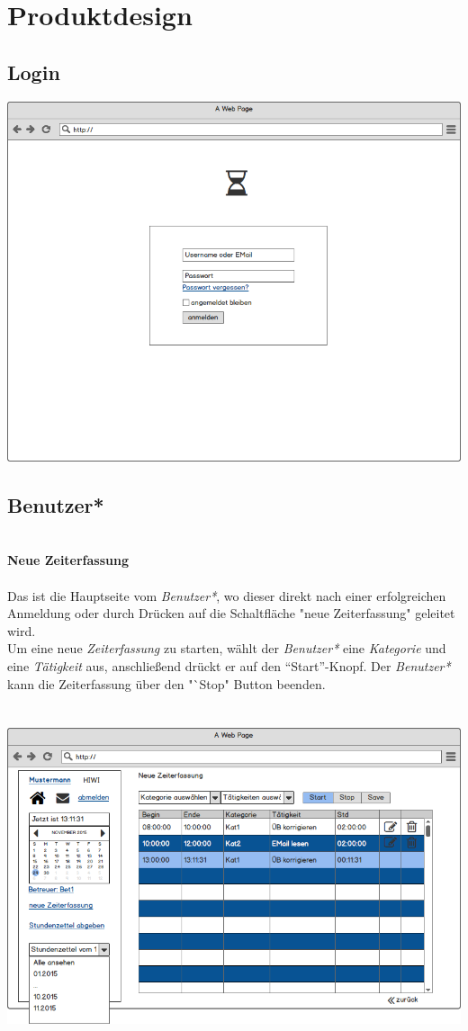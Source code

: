 \section{Produktdesign}

\subsection{Login}
\includegraphics[width=\linewidth]{UI/Login/Login.png}

\newpage
\subsection{Benutzer*}

\textbf{\\Neue Zeiterfassung}\\
\\
Das ist die Hauptseite vom \emph{Benutzer*}, wo dieser direkt nach einer erfolgreichen Anmeldung oder durch Drücken auf die Schaltfläche "neue Zeiterfassung" geleitet wird. \\
Um eine neue \emph{Zeiterfassung} zu starten, wählt der \emph{Benutzer*} eine \emph{Kategorie} und eine \emph{Tätigkeit} aus, anschließend drückt er auf den "`Start"'-Knopf. Der \emph{Benutzer*} kann die Zeiterfassung über den "`Stop"  Button beenden.\\
\\
\\
\includegraphics[width=\linewidth]{UI/Benutzer/Zeiterfassung.png}


